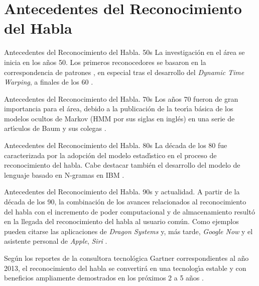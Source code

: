 \section{Antecedentes del Reconocimiento del Habla}

\begin{frame}{Antecedentes del Reconocimiento del Habla. 50s}
La investigaci\'on en el \'area se inicia en los a\~nos 50.
Los primeros reconocedores se basaron en la correspondencia de patrones \cite{DavisAutomatic1952},
en especial tras el desarrollo del \emph{Dynamic Time Warping}, a finales de los
60 \cite{VintsyukSpeech1968}.
\end{frame}

\begin{frame}{Antecedentes del Reconocimiento del Habla. 70s}
Los a\~nos 70 fueron de gran importancia para el \'area,
debido a la publicaci\'on de la teor{\'\i}a b\'asica de los modelos ocultos de Markov (HMM por sus siglas en ingl\'es) 
en una serie de art{\'\i}culos de Baum y sus colegas \cite{Rabiner89atutorial}.
\end{frame}

\begin{frame}{Antecedentes del Reconocimiento del Habla. 80s}
La d\'{e}cada de los 80 fue caracterizada por la adopci\'on del modelo estad{\'\i}stico en el proceso
de reconocimiento del habla. Cabe destacar tambi\'en el
desarrollo del modelo de lenguaje basado en N-gramas en IBM \cite{JelinekTheDevelopment1986}.
\end{frame}

\begin{frame}{Antecedentes del Reconocimiento del Habla. 90s y actualidad.}
A partir de la d\'ecada de los 90, la combinaci\'on de los avances relacionados al 
reconocimiento del habla con el incremento de poder computacional y de almacenamiento result\'o 
en la llegada del reconocimiento del habla al usuario com\'un. Como ejemplos pueden citarse
las aplicaciones de \emph{Dragon Systems} \cite{BarnettMultilingual1996} y, m\'as tarde,
\emph{Google Now} \cite{GoogleNow} y el asistente personal de \emph{Apple}, 
\emph{Siri} \cite{AppleSiri}.

Seg\'un los reportes de la consultora tecnológica Gartner correspondientes al año 2013,
el reconocimiento del habla se convertir\'a en una tecnolog{\'\i}a estable y con beneficios
ampliamente demostrados en los pr\'oximos 2 a 5 a\~nos \cite{Gartner2013}.
\end{frame}

